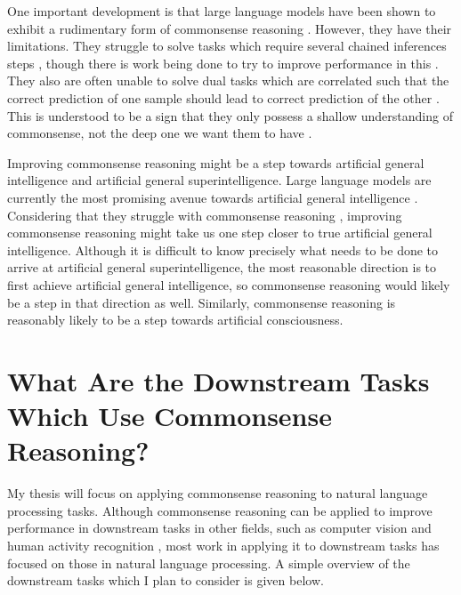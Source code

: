 \documentclass[12pt]{report}
\begin{document}
One important development is that large language models have been shown to exhibit a rudimentary form of commonsense reasoning \cite{Zhou2020-wi,Trinh2018-pm,Rajani2019-zk}.
However, they have their limitations.
They struggle to solve tasks which require several chained inferences steps \cite{Zhou2020-wi}, though there is work being done to try to improve performance in this \cite{Wei2022-nf}.
They also are often unable to solve dual tasks which are correlated such that the correct prediction of one sample should lead to correct prediction of the other \cite{Zhou2020-wi}.
This is understood to be a sign that they only possess a shallow understanding of commonsense, not the deep one we want them to have \cite{Zhou2020-wi}.

Improving commonsense reasoning might be a step towards artificial general intelligence and artificial general superintelligence.
Large language models are currently the most promising avenue towards artificial general intelligence \cite{Bubeck2023-gl}.
Considering that they struggle with commonsense reasoning \cite{Zhou2020-wi}, improving commonsense reasoning might take us one step closer to true artificial general intelligence.
Although it is difficult to know precisely what needs to be done to arrive at artificial general superintelligence, the most reasonable direction is to first achieve artificial general intelligence, so commonsense reasoning would likely be a step in that direction as well.
Similarly, commonsense reasoning is reasonably likely to be a step towards artificial consciousness.

\section{What Are the Downstream Tasks Which Use Commonsense Reasoning?}

My thesis will focus on applying commonsense reasoning to natural language processing tasks.
Although commonsense reasoning can be applied to improve performance in downstream tasks in other fields, such as computer vision \cite{Zellers2019-to} and human activity recognition \cite{Martinez_del_Rincon2013-qo}, most work in applying it to downstream tasks has focused on those in natural language processing.
A simple overview of the downstream tasks which I plan to consider is given below.
\end{document}
